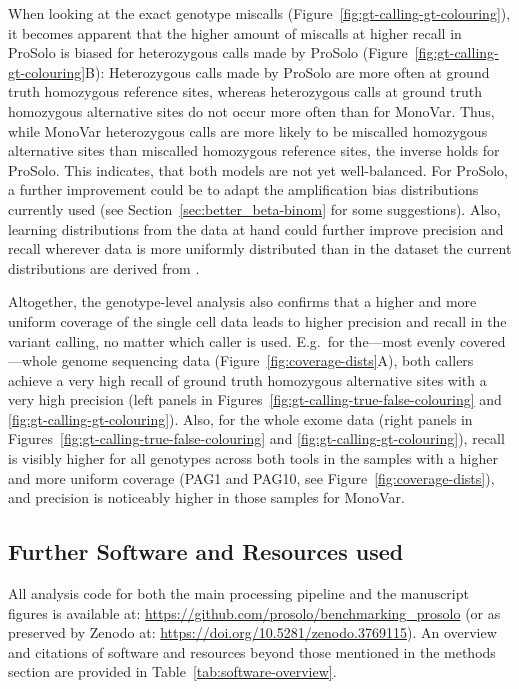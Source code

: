\documentclass[authoryear,preprint,11pt]{scrartcl}
\begin{document}
When looking at the exact genotype miscalls (Figure~\ref{fig:gt-calling-gt-colouring}), it becomes apparent that the higher amount of miscalls at higher recall in ProSolo is biased for heterozygous calls made by ProSolo (Figure~\ref{fig:gt-calling-gt-colouring}B):
Heterozygous calls made by ProSolo are more often at ground truth homozygous reference sites, whereas heterozygous calls at ground truth homozygous alternative sites do not occur more often than for MonoVar.
Thus, while MonoVar heterozygous calls are more likely to be miscalled homozygous alternative sites than miscalled homozygous reference sites, the inverse holds for ProSolo.
This indicates, that both models are not yet well-balanced.
For ProSolo, a further improvement could be to adapt the amplification bias distributions currently used (see Section~\ref{sec:better_beta-binom} for some suggestions).
Also, learning distributions from the data at hand could further improve precision and recall wherever data is more uniformly distributed than in the dataset the current distributions are derived from \citep{lodato_somatic_2015}.

Altogether, the genotype-level analysis also confirms that a higher and more uniform coverage of the single cell data leads to higher precision and recall in the variant calling, no matter which caller is used.
E.g.~for the---most evenly covered---whole genome sequencing data (Figure~\ref{fig:coverage-dists}A), both callers achieve a very high recall of ground truth homozygous alternative sites with a very high precision (left panels in Figures~\ref{fig:gt-calling-true-false-colouring} and \ref{fig:gt-calling-gt-colouring}).
Also, for the whole exome data (right panels in Figures~\ref{fig:gt-calling-true-false-colouring} and \ref{fig:gt-calling-gt-colouring}), recall is visibly higher for all genotypes across both tools in the samples with a higher and more uniform coverage (PAG1 and PAG10, see Figure~\ref{fig:coverage-dists}), and precision is noticeably higher in those samples for MonoVar.

\subsection{Further Software and Resources used}

All analysis code for both the main processing pipeline and the manuscript figures is available at: \url{https://github.com/prosolo/benchmarking_prosolo} (or as preserved by Zenodo at: \url{https://doi.org/10.5281/zenodo.3769115}).
An overview and citations of software and resources beyond those mentioned in the methods section are provided in Table~\ref{tab:software-overview}.
\end{document}

